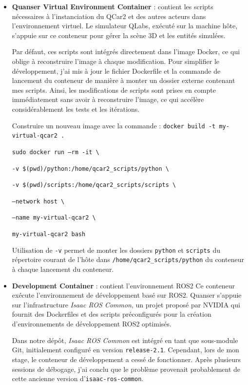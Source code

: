 \documentclass{name}
\begin{document}
\begin{itemize}
    \item \textbf{Quanser Virtual Environment Container} : contient les scripts nécessaires à l'instanciation du QCar2 et des autres acteurs dans l'environnement virtuel. Le simulateur QLabs, exécuté sur la machine hôte, s'appuie sur ce conteneur pour gérer la scène 3D et les entités simulées.
    
    Par défaut, ces scripts sont intégrés directement dans l'image Docker, ce qui oblige à reconstruire l'image à chaque modification. Pour simplifier le développement, j'ai mis à jour le fichier Dockerfile et la commande de lancement du conteneur de manière à monter un dossier externe contenant mes scripts. Ainsi, les modifications de scripts sont prises en compte immédiatement sans avoir à reconstruire l'image, ce qui accélère considérablement les tests et les itérations.

    Construire un nouveau image avec la commande : \texttt{docker build -t my-virtual-qcar2 .}
    
    \texttt{sudo docker run --rm -it \textbackslash}
    
    \texttt{-v \$(pwd)/python:/home/qcar2\_scripts/python \textbackslash}
    
    \texttt{-v \$(pwd)/scripts:/home/qcar2\_scripts/scripts \textbackslash}
    
    \texttt{--network host \textbackslash}
    
    \texttt{--name my-virtual-qcar2 \textbackslash}
    
    \texttt{my-virtual-qcar2 bash}

    Utilisation de \texttt{-v} permet de monter les dossiers \texttt{python} et \texttt{scripts} du répertoire courant de l'hôte dans \texttt{/home/qcar2\_scripts/python} du conteneur à chaque lancement du conteneur.

    \item \textbf{Development Container} : contient l'environnement ROS2 Ce conteneur exécute l'environnement de développement basé sur ROS2. Quanser s'appuie sur l'infrastructure \textit{Isaac ROS Common}, un projet proposé par NVIDIA qui fournit des Dockerfiles et des scripts préconfigurés pour la création d'environnements de développement ROS2 optimisés.

    Dans notre dépôt, \textit{Isaac ROS Common} est intégré en tant que sous-module Git, initialement configuré en version \texttt{release-2.1}. Cependant, lors de mon stage, le conteneur de développement a cessé de fonctionner. Après plusieurs sessions de débogage, j'ai conclu que le problème provenait probablement de cette ancienne version d'\texttt{isaac-ros-common}.


\end{itemize}
\end{document}
